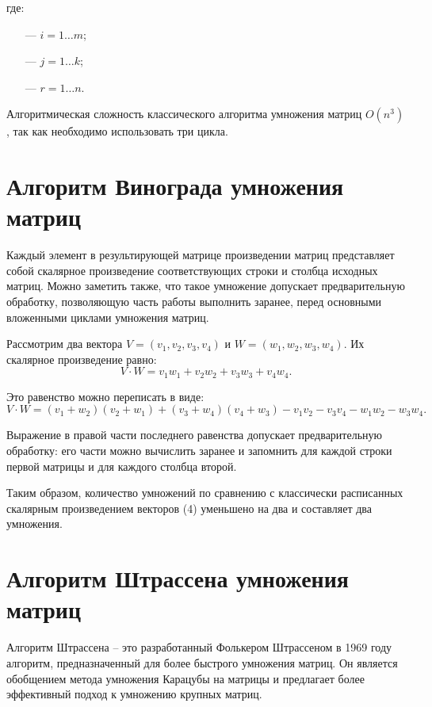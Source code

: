 где:
\begin{itemize}
	\item[---] $i = 1 \ldots m$;
	\item[---] $j = 1 \ldots k$;
	\item[---] $r = 1 \ldots n$.
\end{itemize}

Алгоритмическая сложность классического алгоритма умножения матриц $O(n^3)$, так как необходимо использовать три цикла.

\section{Алгоритм Винограда умножения матриц}

Каждый элемент в результирующей матрице произведении матриц представляет собой скалярное произведение соответствующих строки и столбца исходных матриц. Можно заметить также, что такое умножение допускает предварительную обработку, позволяющую часть работы выполнить заранее, перед основными вложенными циклами умножения матриц.

Рассмотрим два вектора $V = (v_1, v_2, v_3, v_4)$ и $W = (w_1, w_2, w_3, w_4)$. Их скалярное произведение равно:
\begin{equation}
	V \cdot W = v_1w_1 + v_2w_2 + v_3w_3 + v_4w_4.
\end{equation}

Это равенство можно переписать в виде:
\begin{equation}
	V \cdot W = (v_1 + w_2)(v_2 + w_1) + (v_3 + w_4)(v_4 + w_3) - v_1v_2 - v_3v_4 - w_1w_2 - w_3w_4.
\end{equation}

Выражение в правой части последнего равенства допускает предварительную обработку: его части можно вычислить заранее и запомнить для каждой строки первой матрицы и для каждого столбца второй. 

Таким образом, количество умножений по сравнению с классически расписанных скалярным произведением векторов (4) уменьшено на два и составляет два умножения.

\section{Алгоритм Штрассена умножения матриц}

Алгоритм Штрассена – это разработанный Фолькером Штрассеном в 1969 году алгоритм, предназначенный для более быстрого умножения матриц. Он является обобщением метода умножения Карацубы на матрицы и предлагает более эффективный подход к умножению крупных матриц.

